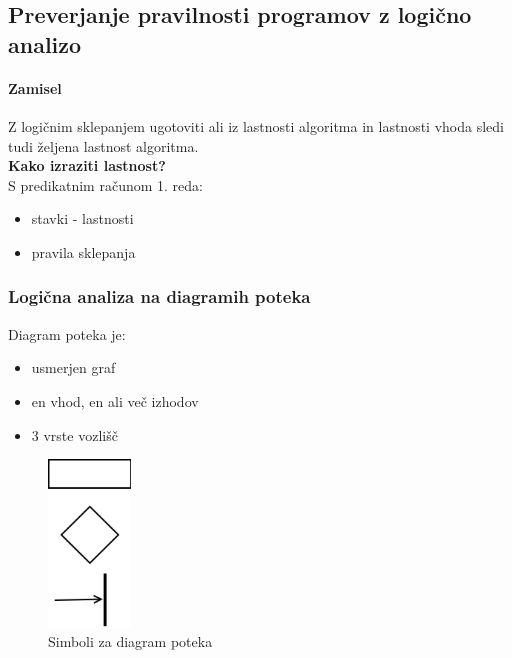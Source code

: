 \documentclass[a4paper,10pt]{article}
\begin{document}
\subsection{Preverjanje pravilnosti programov z logi\v cno analizo}

\paragraph{Zamisel}
Z logi\v cnim sklepanjem ugotoviti ali iz lastnosti algoritma in lastnosti vhoda sledi tudi \v zeljena lastnost algoritma.\\
\textbf{Kako izraziti lastnost?} \\
S predikatnim ra\v cunom 1. reda:
\begin{itemize}
\item stavki - lastnosti
\item pravila sklepanja
\end{itemize}

\subsubsection{Logi\v cna analiza na diagramih poteka}

Diagram poteka je:
\begin{itemize}
\item usmerjen graf
\item en vhod, en ali ve\v c izhodov
\item 3 vrste vozli\v s\v c
\end{itemize}

\begin{figure}[h]
	\centering
	\includegraphics[width=2.2cm,height=4.45cm]{Slike/DiagramPotekaSimboli.png}
	\caption{Simboli za diagram poteka}
\end{figure}
\end{document}
